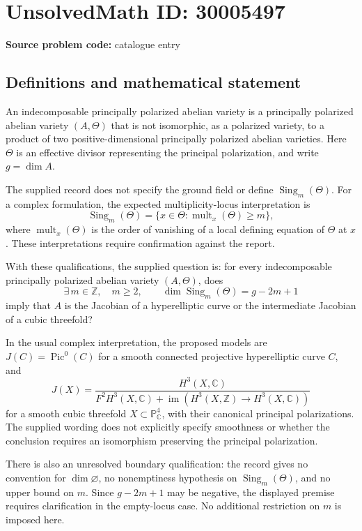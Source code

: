 \documentclass[11pt]{article}
\newcommand{\Z}{\mathbb{Z}}
\newcommand{\C}{\mathbb{C}}
\newcommand{\PP}{\mathbb{P}}
\begin{document}
\section*{UnsolvedMath ID: 30005497}
\textbf{Source problem code:} catalogue entry
\subsection{Definitions and mathematical statement}
An indecomposable principally polarized abelian variety is a principally polarized abelian variety \((A,\Theta)\) that is not isomorphic, as a polarized variety, to a product of two positive-dimensional principally polarized abelian varieties. Here \(\Theta\) is an effective divisor representing the principal polarization, and write \(g=\dim A\).

The supplied record does not specify the ground field or define \(\operatorname{Sing}_m(\Theta)\). For a complex formulation, the expected multiplicity-locus interpretation is
\[
\operatorname{Sing}_m(\Theta)=\{x\in\Theta:\operatorname{mult}_x(\Theta)\geq m\},
\]
where \(\operatorname{mult}_x(\Theta)\) is the order of vanishing of a local defining equation of \(\Theta\) at \(x\). These interpretations require confirmation against the report.

With these qualifications, the supplied question is: for every indecomposable principally polarized abelian variety \((A,\Theta)\), does
\[
\exists\,m\in\Z,\quad m\geq2,\qquad
\dim\operatorname{Sing}_m(\Theta)=g-2m+1
\]
imply that \(A\) is the Jacobian of a hyperelliptic curve or the intermediate Jacobian of a cubic threefold?

In the usual complex interpretation, the proposed models are \(J(C)=\operatorname{Pic}^0(C)\) for a smooth connected projective hyperelliptic curve \(C\), and
\[
J(X)=\frac{H^3(X,\C)}{F^2H^3(X,\C)+\operatorname{im}(H^3(X,\Z)\to H^3(X,\C))}
\]
for a smooth cubic threefold \(X\subset\PP^4_{\C}\), with their canonical principal polarizations. The supplied wording does not explicitly specify smoothness or whether the conclusion requires an isomorphism preserving the principal polarization.

There is also an unresolved boundary qualification: the record gives no convention for \(\dim\varnothing\), no nonemptiness hypothesis on \(\operatorname{Sing}_m(\Theta)\), and no upper bound on \(m\). Since \(g-2m+1\) may be negative, the displayed premise requires clarification in the empty-locus case. No additional restriction on \(m\) is imposed here.
\end{document}

